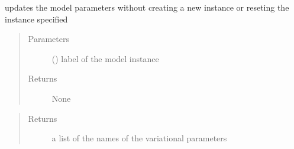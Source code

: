 \documentclass[letterpaper,10pt,english]{sphinxmanual}
\begin{document}
\begin{fulllineitems}
\label{\detokenize{functions:pyqcm.update_bath}}
\sphinxAtStartPar
updates the model parameters without creating a new instance or reseting the instance specified
\begin{quote}\begin{description}
\item[{Parameters}] \leavevmode
\sphinxAtStartPar
{} () \textendash{} label of the model instance

\item[{Returns}] \leavevmode
\sphinxAtStartPar
None

\end{description}\end{quote}

\end{fulllineitems}


\begin{fulllineitems}
\label{\detokenize{functions:pyqcm.variational_parameters}}\begin{quote}\begin{description}
\item[{Returns}] \leavevmode
\sphinxAtStartPar
a list of the names of the variational parameters

\end{description}\end{quote}

\end{fulllineitems}

\end{document}
